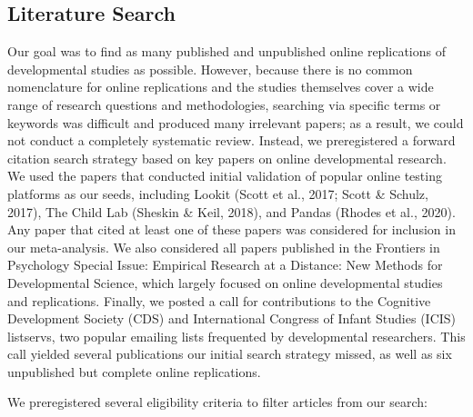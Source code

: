 \documentclass[
  man,floatsintext]{apa6}
\begin{document}
\hypertarget{literature-search}{%
\subsection{Literature Search}\label{literature-search}}

Our goal was to find as many published and unpublished online replications of developmental studies as possible. However, because there is no common nomenclature for online replications and the studies themselves cover a wide range of research questions and methodologies, searching via specific terms or keywords was difficult and produced many irrelevant papers; as a result, we could not conduct a completely systematic review. Instead, we preregistered a forward citation search strategy based on key papers on online developmental research. We used the papers that conducted initial validation of popular online testing platforms as our seeds, including Lookit (Scott et al., 2017; Scott \& Schulz, 2017), The Child Lab (Sheskin \& Keil, 2018), and Pandas (Rhodes et al., 2020). Any paper that cited at least one of these papers was considered for inclusion in our meta-analysis. We also considered all papers published in the Frontiers in Psychology Special Issue: Empirical Research at a Distance: New Methods for Developmental Science, which largely focused on online developmental studies and replications. Finally, we posted a call for contributions to the Cognitive Development Society (CDS) and International Congress of Infant Studies (ICIS) listservs, two popular emailing lists frequented by developmental researchers. This call yielded several publications our initial search strategy missed, as well as six unpublished but complete online replications.

We preregistered several eligibility criteria to filter articles from our search:
\end{document}
